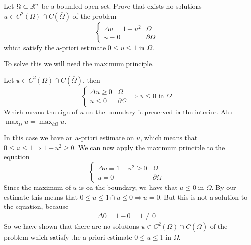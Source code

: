 \newpage
\begin{exercise}
    Let \(\Omega \subset \mathbb{R}^n\) be a bounded open set. Prove that exists no solutions \(u \in C^2(\Omega) \cap C(\overline{\Omega})\) of the problem
    \[
        \begin{cases}
            \Delta u = 1 - u^2 & \Omega         \\
            u = 0              & \partial\Omega
        \end{cases}
    \]
    which satisfy the a-priori estimate \(0 \leq u \leq 1\) in \(\Omega\).
\end{exercise}
To solve this we will need the maximum principle.
\begin{remark}
    Let \(u \in C^2(\Omega) \cap C(\overline{\Omega})\), then
    \[
        \begin{cases}
            \Delta u \geq 0 & \Omega         \\
            u \leq 0        & \partial\Omega
        \end{cases} \Rightarrow u \leq 0 \text{ in } \Omega
    \]
    Which means the sign of \(u\) on the boundary is preserved in the interior.
    Also \(\max_{\overline{\Omega}} u = \max_{\partial\Omega} u\).
\end{remark}
In this case we have an a-priori estimate on \(u\), which means that \(0 \leq u \leq 1 \Rightarrow 1 - u^2 \geq 0\). We can now apply the maximum principle to the equation
\[
    \begin{cases}
        \Delta u = 1 - u^2 \geq 0 & \Omega         \\
        u = 0                     & \partial\Omega
    \end{cases}
\]
Since the maximum of \(u\) is on the boundary, we have that \(u \leq 0\) in
\(\Omega\). By our estimate this means that \(0 \leq u \leq 1 \cap u \leq 0
\Rightarrow u = 0\). But this is not a solution to the equation, because
\[
    \begin{split}
        \Delta 0 = 1 - 0 = 1 \neq 0
    \end{split}
\]
So we have shown that there are no solutions \(u \in C^2(\Omega) \cap
C(\overline{\Omega})\) of the problem which satisfy the a-priori estimate \(0
\leq u \leq 1\) in \(\Omega\).